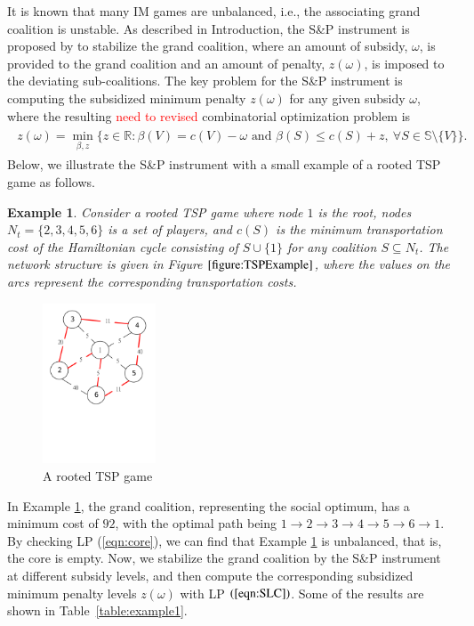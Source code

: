 \documentclass[authoryear,review,12pt]{elsarticle}
\newtheorem{example}{Example}
\newcommand{\R}{\mathbb{R}}
\begin{document}
It is known that many IM games are unbalanced, i.e., the associating grand coalition is unstable.
As described in Introduction, the S\&P instrument is proposed by \cite{leastcore2018} to stabilize the grand coalition, where an amount of subsidy, $\omega$, is provided to the grand coalition and an amount of penalty, $z(\omega)$, is imposed to the deviating sub-coalitions.
The key problem for the S\&P instrument is computing the subsidized minimum penalty $z(\omega)$ for any given subsidy $\omega$, where the resulting
\textcolor{red}{need to revised}
 combinatorial optimization problem is
\begin{eqnarray*}
\begin{aligned}
z(\omega) = \min_{\beta,z} \bigg\{ z \in \R:\beta(V)=c(V)-\omega \mbox{ and } \beta(S) \leq c(S)+z,~\forall S \in \mathbb{S} \setminus \{V\} \bigg\}.
\end{aligned}
\end{eqnarray*}
Below, we illustrate the S\&P instrument with a small example of a rooted TSP game as follows.
\renewcommand{\baselinestretch}{1.5}
\begin{example}\label{example:1}
Consider a rooted TSP game where node $1$ is the root, nodes $N_t=\big\{ 2,3,4,5,6 \big\}$ is a set of players, and $c(S)$ is the minimum transportation cost of the Hamiltonian cycle consisting of $S \cup \{ 1 \}$ for any coalition $S \subseteq N_t$. The network structure is given in Figure $\ref{figure:TSPExample}$, where the values on the arcs represent the corresponding transportation costs.
\end{example}
\begin{figure}[H]
\centering
\includegraphics[width=0.3\textwidth]{ExampleTSP.pdf}
\caption{\label{figure:TSPExample}A rooted TSP game}
\vspace{-5mm}
\end{figure}

In Example \ref{example:1}, the grand coalition, representing the social optimum, has a minimum cost of $92$, with the optimal path being $1 \rightarrow 2 \rightarrow 3 \rightarrow 4 \rightarrow 5 \rightarrow 6 \rightarrow 1$.
By checking LP (\ref{eqn:core}), we can find that Example \ref{example:1} is unbalanced, that is, the core is empty.
Now, we stabilize the grand coalition by the S\&P instrument at different subsidy levels, and then compute the corresponding subsidized minimum penalty levels $z(\omega)$ with LP $(\ref{eqn:SLC})$. Some of the results are shown in Table~\ref{table:example1}.
\end{document}
